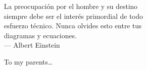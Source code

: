 \thispagestyle{empty}


\vspace*{3cm}

\begin{raggedleft}
    La preocupación por el hombre y su destino\\
    siempre debe ser el interés primordial de todo \\
    esfuerzo técnico. Nunca olvides esto entre tus \\
    diagramas y ecuaciones.\\
     --- Albert Einstein\\
\end{raggedleft}

\vspace{4cm}

\begin{center}
    To my parents\dots
\end{center}


